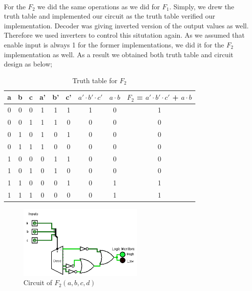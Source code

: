 \documentclass[pdftex,12pt,a4paper]{article}
\begin{document}
\paragraph{}
For the $F_{2}$ we did the same operations as we did for $F_{1}$. Simply, we drew the truth table and implemented our circuit as the truth table verified our implementation. Decoder was giving inverted version of the output values as well. Therefore we used inverters to control this situtation again. As we assumed that enable input is always 1 for the former implementations, we did it for the $F_{2}$ implementation as well. As a result we obtained both truth table and circuit design as below;\newline

\begin{table}[!h]
\centering
\begin{tabular}{|c|c|c|c|c|c|c|c|c|}
\hline
a & b & c & a' & b' & c' & $a' \cdot b' \cdot c'$ & $a \cdot b$ & $F_{2}$ = $a' \cdot b' \cdot c'$ + $a \cdot b$      \\ \hline
0 & 0 & 0 & 1  & 1  & 1  & 1             & 0      & 1             \\ \hline
0 & 0 & 1 & 1  & 1  & 0  & 0             & 0      & 0               \\ \hline
0 & 1 & 0 & 1  & 0  & 1  & 0             & 0      & 0              \\ \hline
0 & 1 & 1 & 1  & 0  & 0  & 0             & 0      & 0               \\ \hline
1 & 0 & 0 & 0  & 1  & 1  & 0             & 0      & 0               \\ \hline
1 & 0 & 1 & 0  & 1  & 0  & 0             & 0      & 0           \\ \hline
1 & 1 & 0 & 0  & 0  & 1  & 0             & 1      & 1          \\ \hline
1 & 1 & 1 & 0  & 0  & 0  & 0             & 1      & 1               \\ \hline
\end{tabular}
\caption{Truth table for $F_{2}$}
\label{truth4}
\end{table}

\begin{figure}[!h]
	\centering
	\includegraphics[width=0.55\textwidth]{part4-2.png}	
	\caption{Circuit of $F_{2}(a,b,c,d)$}
	\label{log5}
\end{figure}
\end{document}
